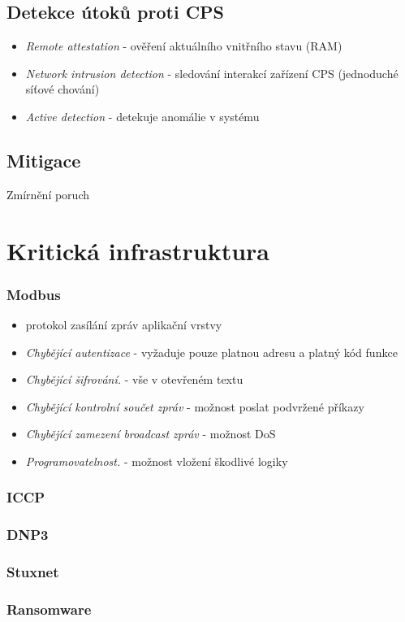 \documentclass[10pt,a4paper]{article}
\begin{document}
\subsection{Detekce útoků proti CPS }
\begin{itemize}
    \item \textit{Remote attestation} - ověření aktuálního vnitřního stavu (RAM)
    \item \textit{Network intrusion detection} - sledování interakcí zařízení CPS (jednoduché síťové chování)
    \item \textit{Active detection} - detekuje anomálie v systému
\end{itemize}

\subsection{Mitigace}
Zmírnění poruch


\section{Kritická infrastruktura}

\subsubsection*{Modbus}
\begin{itemize}
    \item protokol zasílání zpráv aplikační vrstvy
    \item \textit{Chybějící autentizace} - vyžaduje pouze platnou adresu a platný kód funkce
    \item \textit{Chybějící šifrování.} - vše v otevřeném textu
    \item \textit{Chybějící kontrolní součet zpráv} - možnost poslat podvržené příkazy
    \item \textit{Chybějící zamezení broadcast zpráv} - možnost DoS
    \item \textit{Programovatelnost.} - možnost vložení škodlivé logiky 
\end{itemize}

\subsubsection*{ICCP}
\subsubsection*{DNP3}
\subsubsection*{Stuxnet}
\subsubsection*{Ransomware}
\end{document}
